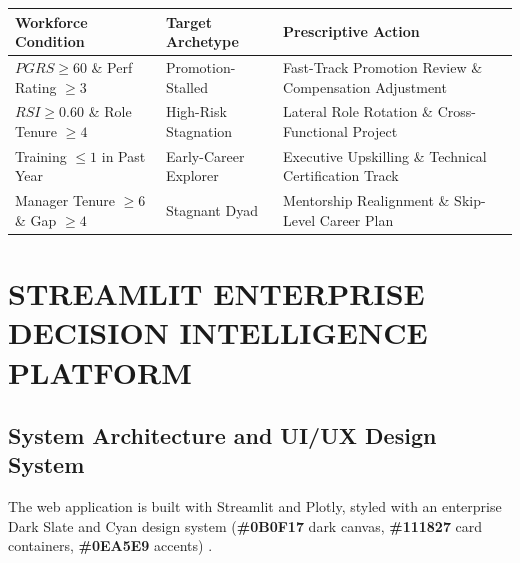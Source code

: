 \documentclass[12pt,a4paper,oneside]{report}
\newcommand{\code}[1]{{\setlength{\fboxsep}{2.5pt}\colorbox{inlinecodebg}{\small\ttfamily\bfseries#1}}}
\begin{document}
\begin{center}
\begin{tabular}{|L{4.2cm}|L{4.2cm}|L{7.5cm}|}
\hline
\textbf{Workforce Condition} & \textbf{Target Archetype} & \textbf{Prescriptive Action} \\ \hline
$PGRS \ge 60$ \& Perf Rating $\ge 3$ & Promotion-Stalled & Fast-Track Promotion Review \& Compensation Adjustment \\ \hline
$RSI \ge 0.60$ \& Role Tenure $\ge 4$ & High-Risk Stagnation & Lateral Role Rotation \& Cross-Functional Project \\ \hline
Training $\le 1$ in Past Year & Early-Career Explorer & Executive Upskilling \& Technical Certification Track \\ \hline
Manager Tenure $\ge 6$ \& Gap $\ge 4$ & Stagnant Dyad & Mentorship Realignment \& Skip-Level Career Plan \\ \hline
\end{tabular}
\vspace{0.05in}
\label{tab:prescriptive_routing}
\end{center}

\clearpage
\chapter{STREAMLIT ENTERPRISE DECISION INTELLIGENCE PLATFORM}

\section{System Architecture and UI/UX Design System}
The web application is built with Streamlit and Plotly, styled with an enterprise Dark Slate and Cyan design system (\code{\#0B0F17} dark canvas, \code{\#111827} card containers, \code{\#0EA5E9} accents) \cite{ref_breiman_ml}.
\end{document}
